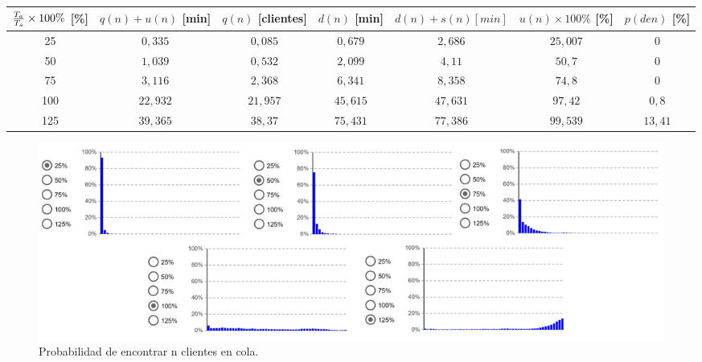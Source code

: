 \begin{tabular}{||c||c|c|c|c|c|c||}
    \hline \hline
    ${T_a \over T_s}\times100\%$ [\%] & $q(n)+u(n)$ [min] & $q(n)$ [clientes] & $d(n)$ [min] & $d(n)+s(n) [min]$ & $u(n)\times100\%$ [\%] & $p(den)$ [\%] \\
    \hline \hline
    25 & $0,335$ & $0,085$ & $0,679$ & $2,686$ & $25,007$ & $0$ \\
    \hline
    50 & $1,039$ & $0,532$ & $2,099$ & $4,11$ & $50,7$ & $0$ \\
    \hline
    75 & $3,116$ & $2,368$ & $6,341$ & $8,358$ & $74,8$ & $0$ \\
    \hline
    100 & $22,932$ & $21,957$ & $45,615$ & $47,631$ & $97,42$ & $0,8$ \\
    \hline
    125 & $39,365$ & $38,37$ & $75,431$ & $77,386$ & $99,539$ & $13,41$ \\
    \hline \hline
\end{tabular}

\begin{figure}[H]
  \includegraphics[width=\linewidth]{images/anylogic-colas-50}
  \caption{Probabilidad de encontrar n clientes en cola.}
\end{figure}
